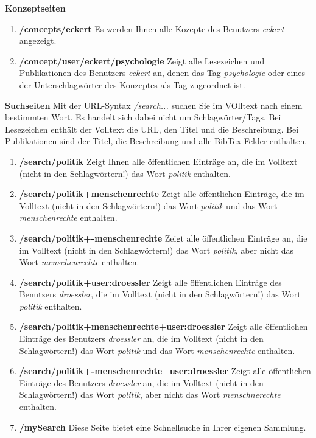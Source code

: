 \documentclass[a4paper,11pt,twoside]{scrbook}
\begin{document}
\textbf{Konzeptseiten}
\begin{enumerate}
    \item \textbf{/concepts/eckert} \newline
    Es werden Ihnen alle Kozepte des Benutzers \textit{eckert} angezeigt.
    \item \textbf{/concept/user/eckert/psychologie} \newline
    Zeigt alle Lesezeichen und Publikationen des Benutzers \textit{eckert} an, denen das Tag \textit{psychologie} oder eines der Unterschlagwörter des Konzeptes als Tag zugeordnet ist. 
\end{enumerate}
\textbf{Suchseiten}\newline
Mit der URL-Syntax \textit{/search...} suchen Sie im VOlltext nach einem bestimmten Wort. Es handelt sich dabei nicht um Schlagwörter/Tags. Bei Lesezeichen enthält der Volltext die URL, den Titel und die Beschreibung. Bei Publikationen sind der Titel, die Beschreibung und alle BibTex-Felder enthalten.
\begin{enumerate}
    \item \textbf{/search/politik} \newline
    Zeigt Ihnen alle öffentlichen Einträge an, die im Volltext (nicht in den Schlagwörtern!) das Wort \textit{politik} enthalten. 
    \item \textbf{/search/politik+menschenrechte}\newline
    Zeigt alle öffentlichen Einträge, die im Volltext (nicht in den Schlagwörtern!) das Wort \textit{politik} und das Wort \textit{menschenrechte} enthalten. 
    \item \textbf{/search/politik+-menschenrechte} \newline
    Zeigt alle öffentlichen Einträge an, die im Volltext (nicht in den Schlagwörtern!) das Wort \textit{politik}, aber nicht das Wort \textit{menschenrechte} enthalten. 
    \item \textbf{/search/politik+user:droessler} \newline
    Zeigt alle öffentlichen Einträge des Benutzers \textit{droessler}, die im Volltext (nicht in den Schlagwörtern!) das Wort \textit{politik} enthalten. 
    \item \textbf{/search/politik+menschenrechte+user:droessler}\newline
    Zeigt alle öffentlichen Einträge des Benutzers \textit{droessler} an, die im Volltext (nicht in den Schlagwörtern!) das Wort \textit{politik} und das Wort \textit{menschenrechte} enthalten. 
    \item \textbf{/search/politik+-menschenrechte+user:droessler} \newline
    Zeigt alle öffentlichen Einträge des Benutzers \textit{droessler} an, die im Volltext (nicht in den Schlagwörtern!) das Wort \textit{politik}, aber nicht das Wort \textit{menschnerechte} enthalten. 
    \item \textbf{/mySearch} \newline
    Diese Seite bietet eine Schnellsuche in Ihrer eigenen Sammlung.
\end{enumerate}
\end{document}
